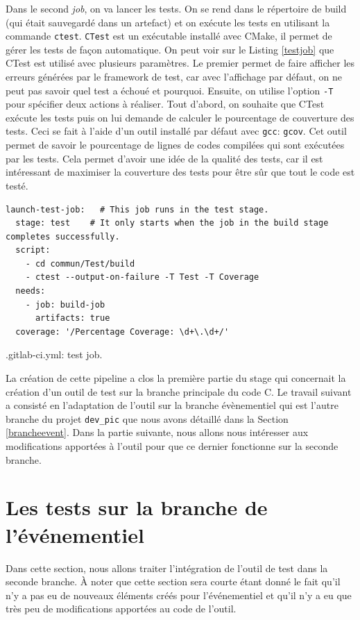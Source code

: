 \documentclass[a4paper]{article}
\begin{document}
Dans le second \textit{job}, on va lancer les tests. On se rend dans le
répertoire de build (qui était sauvegardé dans un artefact) et on exécute les
tests en utilisant la commande \verb|ctest|. \verb|CTest| est un exécutable
installé avec CMake, il permet de gérer les tests de façon automatique. On peut
voir sur le Listing \ref{testjob} que CTest est utilisé avec plusieurs
paramètres. Le premier permet de faire afficher les erreurs générées par le
framework de test, car avec l'affichage par défaut, on ne peut pas savoir quel
test a échoué et pourquoi. Ensuite, on utilise l'option \verb|-T| pour spécifier
deux actions à réaliser. Tout d'abord, on souhaite que CTest exécute les tests
puis on lui demande de calculer le pourcentage de couverture des tests. Ceci se
fait à l'aide d'un outil installé par défaut avec \verb|gcc|: \verb|gcov|. Cet
outil permet de savoir le pourcentage de lignes de codes compilées qui sont
exécutées par les tests. Cela permet d'avoir une idée de la qualité des tests,
car il est intéressant de maximiser la couverture des tests pour être sûr que
tout le code est testé.

\begin{listing}[ht!]
\begin{verbatim}
launch-test-job:   # This job runs in the test stage.
  stage: test    # It only starts when the job in the build stage completes successfully.
  script:
    - cd commun/Test/build
    - ctest --output-on-failure -T Test -T Coverage
  needs:
    - job: build-job
      artifacts: true
  coverage: '/Percentage Coverage: \d+\.\d+/'
\end{verbatim}
\caption{.gitlab-ci.yml: test job.}
\label{testjob}
\end{listing}

La création de cette pipeline a clos la première partie du stage qui concernait
la création d'un outil de test sur la branche principale du code C. Le travail
suivant a consisté en l'adaptation de l'outil sur la branche évènementiel qui
est l'autre branche du projet \verb|dev_pic| que nous avons détaillé dans la
Section \ref{brancheevent}. Dans la partie suivante, nous allons nous intéresser
aux modifications apportées à l'outil pour que ce dernier fonctionne sur la
seconde branche.
\section{Les tests sur la branche de l'événementiel}%

Dans cette section, nous allons traiter l'intégration de l'outil de test dans la
seconde branche. À noter que cette section sera courte étant donné le fait qu'il
n'y a pas eu de nouveaux éléments créés pour l'événementiel et qu'il n'y a eu que
très peu de modifications apportées au code de l'outil.
\end{document}
